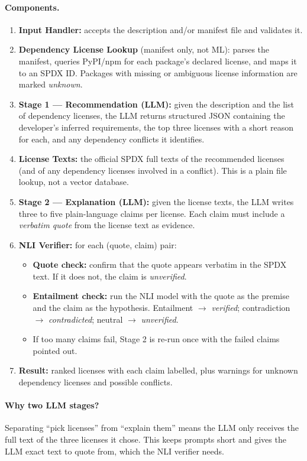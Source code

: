 \documentclass[11pt]{article}
\begin{document}
\paragraph{Components.}
\begin{enumerate}
  \item \textbf{Input Handler:} accepts the description and/or manifest file and validates it.
  \item \textbf{Dependency License Lookup} (manifest only, not ML): parses the manifest, queries PyPI/npm for each package's declared license, and maps it to an SPDX ID. Packages with missing or ambiguous license information are marked \emph{unknown}.
  \item \textbf{Stage 1 --- Recommendation (LLM):} given the description and the list of dependency licenses, the LLM returns structured JSON containing the developer's inferred requirements, the top three licenses with a short reason for each, and any dependency conflicts it identifies.
  \item \textbf{License Texts:} the official SPDX full texts of the recommended licenses (and of any dependency licenses involved in a conflict). This is a plain file lookup, not a vector database.
  \item \textbf{Stage 2 --- Explanation (LLM):} given the license texts, the LLM writes three to five plain-language claims per license. Each claim must include a \emph{verbatim quote} from the license text as evidence.
  \item \textbf{NLI Verifier:} for each (quote, claim) pair:
  \begin{itemize}
    \item \textbf{Quote check:} confirm that the quote appears verbatim in the SPDX text. If it does not, the claim is \emph{unverified}.
    \item \textbf{Entailment check:} run the NLI model with the quote as the premise and the claim as the hypothesis. Entailment $\rightarrow$ \emph{verified}; contradiction $\rightarrow$ \emph{contradicted}; neutral $\rightarrow$ \emph{unverified}.
    \item If too many claims fail, Stage 2 is re-run once with the failed claims pointed out.
  \end{itemize}
  \item \textbf{Result:} ranked licenses with each claim labelled, plus warnings for unknown dependency licenses and possible conflicts.
\end{enumerate}

\paragraph{Why two LLM stages?}
Separating ``pick licenses'' from ``explain them'' means the LLM only receives the full text of the three licenses it chose. This keeps prompts short and gives the LLM exact text to quote from, which the NLI verifier needs.
\end{document}
